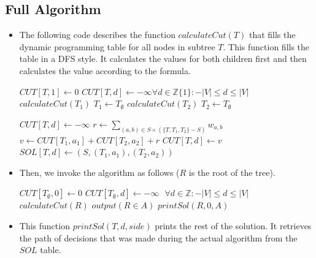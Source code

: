 \documentclass[12pt]{article}
\begin{document}
\subsection*{Full Algorithm}
\begin{itemize}
\item The following code describes the function $\mathit{calculateCut}(T)$ that fills the dynamic programming table for all nodes in subtree $T$. This function fills the table in a DFS style. It calculates the values for both children first and then calculates the value according to the formula.

\begin{algorithmic}
		\State $\mathit{CUT}[T, 1] \gets 0$
		\State $\mathit{CUT}[T, d] \gets -\infty \forall d \in \mathbb{Z}\{1\}: -|V| \leq d \leq |V|$
	\Else
			\State $\mathit{calculateCut}(T_1)$
		\Else
			\State $T_1 \gets T_\emptyset$
		\EndIf
			\State $\mathit{calculateCut}(T_2)$
		\Else
			\State $T_2 \gets T_\emptyset$
		\EndIf

		\State $\mathit{CUT}[T, d] \gets -\infty$
			\State $r \gets \sum_{(a,b) \in S \times (\{T, T_1, T_2\} - S)} w_{a,b}$
				\State $v \gets \mathit{CUT}[T_1, a_1] + \mathit{CUT}[T_2, a_2] + r$
					\State $\mathit{CUT}[T, d] \gets v$
					\State $\mathit{SOL}[T, d] \gets (S, (T_1, a_1), (T_2, a_2))$
				\EndIf
			\EndFor
		\EndFor
		\EndFor
	\EndIf
\end{algorithmic}

\item Then, we invoke the algorithm as follows ($R$ is the root of the tree).

\begin{algorithmic}
	\State $\mathit{CUT}[T_\emptyset, 0] \gets 0$
	\State $\mathit{CUT}[T_\emptyset, d] \gets -\infty \mbox{  } \forall d \in \mathbb{Z}: -|V| \leq d \leq |V|$
	\State $\mathit{calculateCut}(R)$
	\State $\mathit{output}(R \in A)$
	\State $\mathit{printSol}(R, 0, A)$
\end{algorithmic}

\item This function $\mathit{printSol}(T, d, \mathit{side})$ prints the rest of the solution. It retrieves the path of decisions that was made during the actual algorithm from the $\mathit{SOL}$ table.


\end{itemize}
\end{document}
